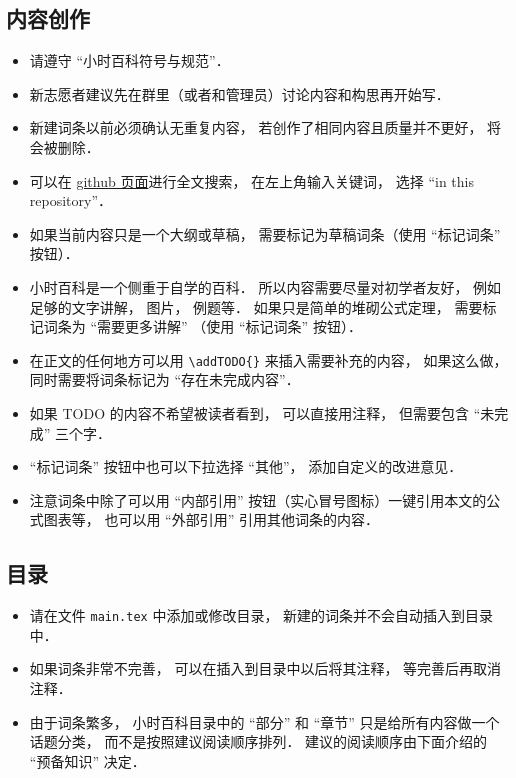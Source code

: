 
\subsection{内容创作}
\begin{itemize}
\item 请遵守 “小时百科符号与规范”．
\item 新志愿者建议先在群里（或者和管理员）讨论内容和构思再开始写．
\item 新建词条以前必须确认无重复内容， 若创作了相同内容且质量并不更好， 将会被删除．
\item 可以在 \href{https://github.com/MacroUniverse/PhysWiki}{github 页面}进行全文搜索， 在左上角输入关键词， 选择 “in this repository”．
\item 如果当前内容只是一个大纲或草稿， 需要标记为草稿词条（使用 “标记词条” 按钮）．
\item 小时百科是一个侧重于自学的百科． 所以内容需要尽量对初学者友好， 例如足够的文字讲解， 图片， 例题等． 如果只是简单的堆砌公式定理， 需要标记词条为 “需要更多讲解” （使用 “标记词条” 按钮）．
\item 在正文的任何地方可以用 \verb|\addTODO{}| 来插入需要补充的内容， 如果这么做， 同时需要将词条标记为 “存在未完成内容”．
\item 如果 TODO 的内容不希望被读者看到， 可以直接用注释， 但需要包含 “未完成” 三个字．
\item “标记词条” 按钮中也可以下拉选择 “其他”， 添加自定义的改进意见．
\item 注意词条中除了可以用 “内部引用” 按钮（实心冒号图标）一键引用本文的公式图表等， 也可以用 “外部引用” 引用其他词条的内容．
\end{itemize}

\subsection{目录}
\begin{itemize}
\item 请在文件 \verb|main.tex| 中添加或修改目录， 新建的词条并不会自动插入到目录中．
\item 如果词条非常不完善， 可以在插入到目录中以后将其注释， 等完善后再取消注释．
\item 由于词条繁多， 小时百科目录中的 “部分” 和 “章节” 只是给所有内容做一个话题分类， 而不是按照建议阅读顺序排列． 建议的阅读顺序由下面介绍的 “预备知识” 决定．
\end{itemize}

